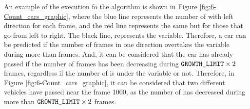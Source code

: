 An example of the execution fo the algorithm is shown in Figure \ref{fig:6-Count_cars_graphic}, where the blue line represents the number of  with left direction for each frame, and the red line represents the same but for those that go from left to right. The black line, represents the  variable. Therefore, a car can be predicted if the number of frames in one direction overtakes the  variable during more than  frames. And, it can be considered that the car has already passed if the number of frames has been decreasing during $\mbox{\texttt{GROWTH\_LIMIT}} \times 2 $ frames, regardless if the number of  is under the  variable or not. Therefore, in Figure \ref{fig:6-Count_cars_graphic}, it can be considered that two different vehicles have passed near the frame 1000, as the number of  has decreased during more than $\mbox{\texttt{GROWTH\_LIMIT}} \times 2 $ frames.

